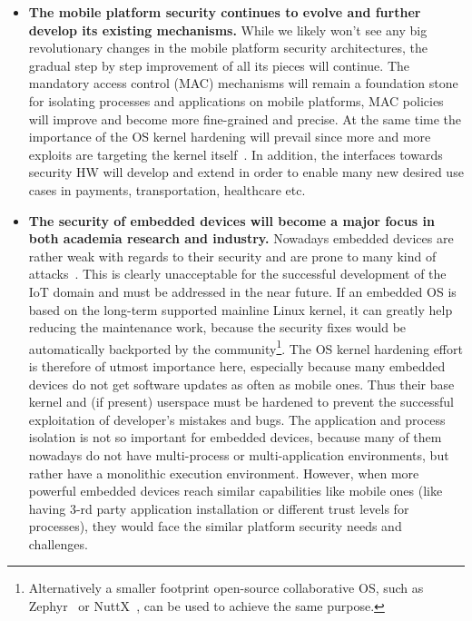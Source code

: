 \begin{itemize}
	\item \textbf{The mobile platform security continues to evolve and further develop its existing mechanisms.} While we likely won't see any big revolutionary changes in the mobile platform security architectures, the gradual step by step improvement of all its pieces will continue. The mandatory access control (MAC) mechanisms will remain a foundation stone for isolating processes and applications on mobile platforms, MAC policies will improve and become more fine-grained and precise. At the same time the importance of the OS kernel hardening will prevail since more and more exploits are targeting the kernel itself~\cite{stoep2016android}. In addition, the interfaces towards security HW will develop and extend in order to enable many new desired use cases in payments, transportation, healthcare etc.  
	\item \textbf{The security of embedded devices will become a major focus in both academia research and industry.} Nowadays embedded devices are rather weak with regards to their security and are prone to many kind of attacks~\cite{Choo2016}. This is clearly unacceptable for the successful development of the IoT domain and must be addressed in the near future. If an embedded OS is based on the long-term supported mainline Linux kernel, it can greatly help reducing the maintenance work, because the security fixes would be automatically backported by the community\footnote{Alternatively a smaller footprint open-source collaborative OS, such as Zephyr~\cite{zephyr} or NuttX~\cite{NuttX}, can be used to achieve the same purpose.}. The OS kernel hardening effort is therefore of utmost importance here, especially because many embedded devices do not get software updates as often as mobile ones. Thus their base kernel and (if present) userspace must be hardened to prevent the successful exploitation of developer's mistakes and bugs. The application and process isolation is not so important for embedded devices, because many of them nowadays do not have multi-process or multi-application environments, but rather have a monolithic execution environment. However, when more powerful embedded devices reach similar capabilities like mobile ones (like having 3-rd party application installation or different trust levels for processes), they would face the similar platform security needs and challenges. 

\end{itemize}
